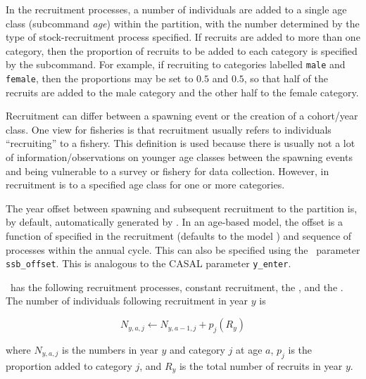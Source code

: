 In the recruitment processes, a number of individuals are added to a single age class (subcommand \textit{age}) within the partition, with the number determined by the type of stock-recruitment process specified. If recruits are added to more than one category, then the proportion of recruits to be added to each category is specified by the  subcommand. For example, if recruiting to categories labelled \texttt{male} and \texttt{female}, then the proportions may be set to $0.5$ and $0.5$, so that half of the recruits are added to the male category and the other half to the female category.

Recruitment can differ between a spawning event or the creation of a cohort/year class. One view for fisheries is that recruitment usually refers to individuals \enquote{recruiting} to a fishery. This definition is used because there is usually not a lot of information/observations on younger age classes between the spawning events and being vulnerable to a survey or fishery for data collection. However, in \CNAME\, recruitment is to a specified age class for one or more categories.

The year offset  between spawning and subsequent recruitment to the partition is, by default, automatically generated by \CNAME. In an age-based model, the  offset is a function of  specified in the recruitment  (defaults to the model ) and sequence of processes within the annual cycle. This can also be specified using the \CNAME\ parameter \texttt{ssb\_offset}. This is analogous to the CASAL parameter \texttt{y\_enter}.

\CNAME\ has the following recruitment processes, constant recruitment, the  \citep{1203}, and the . The  number of individuals following recruitment in year $y$ is

\begin{equation}
N_{y,a,j} \leftarrow N_{y,a - 1,j} + p_j(R_y)
\end{equation}

where $N_{y,a,j}$ is the numbers in year $y$ and category $j$ at age $a$, $p_j$ is the proportion added to category $j$, and $R_y$ is the total number of recruits in year $y$.

\paragraph{}\label{sec:Process-RecruitmentConstant}


